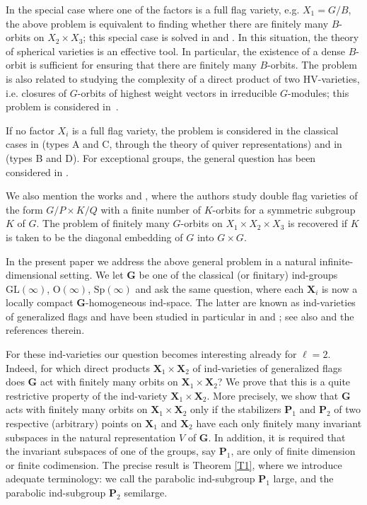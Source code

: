 \documentclass[12pt]{amsart}
\newcommand{\GL}{\mathrm{GL}}
\newcommand{\Sp}{\mathrm{Sp}}
\renewcommand{\O}{\mathrm{O}}
\newcommand{\G}{\mathbf{G}}
\renewcommand{\P}{\mathbf{P}}
\newcommand{\X}{\mathbf{X}}
\numberwithin{equation}{section}
\theoremstyle{definition}
\begin{document}
In the special case where one of the factors is a full flag variety, e.g. $X_1=G/B$, the above problem is equivalent to finding whether there are finitely many $B$-orbits on $X_2\times X_3$; this special case is solved in \cite{Littelmann} and \cite{Stembridge}. In this situation, the theory of spherical varieties is an effective tool. 
In particular, the existence of a dense $B$-orbit is sufficient for ensuring that there are finitely many $B$-orbits.
The problem is also related to studying the complexity
of a direct product of two HV-varieties, i.e. closures of $G$-orbits of highest weight vectors in irreducible $G$-modules; this problem is considered in~\cite{Panyushev}.

If no factor $X_i$ is a full flag variety, the problem is considered in the classical cases in \cite{MWZ1,MWZ2} (types A and C, through the theory of quiver representations) and in \cite{Matsuki1,Matsuki2} (types B and D).
For exceptional groups, the general question has been considered in \cite{BDEK}.

We also mention the works \cite{HNOO} and \cite{NO}, where the authors study double flag varieties of the form $G/P\times K/Q$ with a finite number of $K$-orbits
for a symmetric subgroup $K$ of $G$.
The problem of finitely many $G$-orbits on $X_1\times X_2\times X_3$ is recovered if
$K$ is taken to be the diagonal embedding of $G$ into $G\times G$.

In the present paper we address the above general problem in a natural infinite-dimensional setting. We let $\G$ be one of the classical (or finitary) ind-groups $\GL(\infty)$,  $\O(\infty)$, $\Sp(\infty)$ and ask the same question, where each $\X_i$ is now a locally compact $\G$-homogeneous ind-space. The latter are known as ind-varieties of generalized flags and have been studied in particular in \cite{Dimitrov-Penkov} and  \cite{Fresse-Penkov}; see also \cite{DPW} and the references therein. 

For these ind-varieties our question becomes interesting already for $\ell=2$. Indeed, for which direct products $\X_1\times \X_2$ of ind-varieties of generalized flags does $\G$ act with finitely many orbits on $\X_1\times \X_2$? We prove that this is a quite restrictive property of the ind-variety $\X_1\times\X_2$. More precisely, we show that $\G$ acts with finitely many orbits on $\X_1\times\X_2$ only if the stabilizers $\P_1$ and $\P_2$ of two respective (arbitrary) points on $\X_1$ and $\X_2$ have each only finitely many invariant subspaces in the natural representation $V$ of $\G$. In addition, it is required that the invariant subspaces of one of the groups, say $\P_1$, are only of finite dimension or finite codimension. The precise result is Theorem \ref{T1}, where we introduce adequate terminology: we call the parabolic ind-subgroup $\P_1$ large, and the parabolic ind-subgroup $\P_2$ semilarge.
\end{document}
